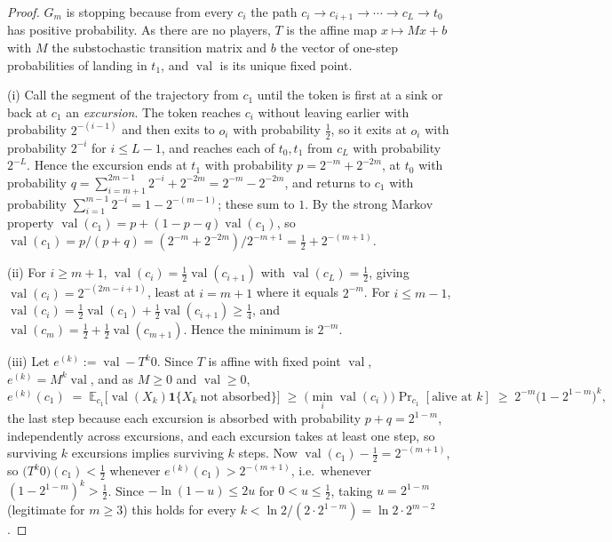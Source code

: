 \documentclass[11pt]{article}
\theoremstyle{plain}
\theoremstyle{definition}
\DeclareMathOperator{\val}{val}
\begin{document}
\begin{proof}
$G_m$ is stopping because from every $c_i$ the path
$c_i\to c_{i+1}\to\cdots\to c_L\to t_0$ has positive probability.
As there are no players, $T$ is the affine map $x\mapsto Mx+b$ with $M$
the substochastic transition matrix and $b$ the vector of one-step
probabilities of landing in $t_1$, and $\val$ is its unique fixed point.

(i) Call the segment of the trajectory from $c_1$ until the token is
first at a sink or back at $c_1$ an \emph{excursion}. The token reaches
$c_i$ without leaving earlier with probability $2^{-(i-1)}$ and then
exits to $o_i$ with probability $\tfrac12$, so it exits at $o_i$ with
probability $2^{-i}$ for $i\le L-1$, and reaches each of $t_0,t_1$ from
$c_L$ with probability $2^{-L}$. Hence the excursion ends at $t_1$ with
probability $p=2^{-m}+2^{-2m}$, at $t_0$ with probability
$q=\sum_{i=m+1}^{2m-1}2^{-i}+2^{-2m}=2^{-m}-2^{-2m}$, and returns to
$c_1$ with probability $\sum_{i=1}^{m-1}2^{-i}=1-2^{-(m-1)}$; these sum
to $1$. By the strong Markov property
$\val(c_1)=p+(1-p-q)\val(c_1)$, so
$\val(c_1)=p/(p+q)=(2^{-m}+2^{-2m})/2^{-m+1}=\tfrac12+2^{-(m+1)}$.

(ii) For $i\ge m+1$, $\val(c_i)=\tfrac12\val(c_{i+1})$ with
$\val(c_L)=\tfrac12$, giving $\val(c_i)=2^{-(2m-i+1)}$, least at $i=m+1$
where it equals $2^{-m}$. For $i\le m-1$,
$\val(c_i)=\tfrac12\val(c_1)+\tfrac12\val(c_{i+1})\ge\tfrac14$, and
$\val(c_m)=\tfrac12+\tfrac12\val(c_{m+1})$. Hence the minimum is
$2^{-m}$.

(iii) Let $e^{(k)}:=\val-T^{k}0$. Since $T$ is affine with fixed point
$\val$, $e^{(k)}=M^{k}\val$, and as $M\ge0$ and $\val\ge0$,
\[
  e^{(k)}(c_1)\;=\;\mathbb{E}_{c_1}\bigl[\val(X_k)\mathbf{1}\{X_k\ \text{not absorbed}\}\bigr]
  \;\ge\;\bigl(\min_i\val(c_i)\bigr)\Pr\nolimits_{c_1}[\text{alive at }k]
  \;\ge\;2^{-m}\bigl(1-2^{1-m}\bigr)^{k},
\]
the last step because each excursion is absorbed with probability
$p+q=2^{1-m}$, independently across excursions, and each excursion takes
at least one step, so surviving $k$ excursions implies surviving $k$
steps. Now $\val(c_1)-\tfrac12=2^{-(m+1)}$, so
$\bigl(T^{k}0\bigr)(c_1)<\tfrac12$ whenever
$e^{(k)}(c_1)>2^{-(m+1)}$, i.e.\ whenever $(1-2^{1-m})^{k}>\tfrac12$.
Since $-\ln(1-u)\le 2u$ for $0<u\le\tfrac12$, taking $u=2^{1-m}$
(legitimate for $m\ge3$) this holds for every
$k<\ln2/(2\cdot2^{1-m})=\ln2\cdot2^{m-2}$.
\end{proof}
\end{document}
